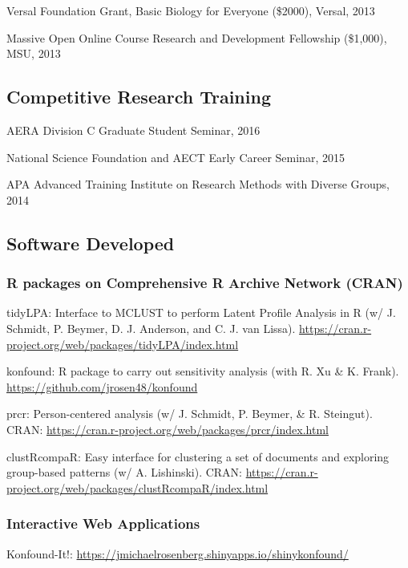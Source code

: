 \documentclass[]{article}
\begin{document}
Versal Foundation Grant, Basic Biology for Everyone (\$2000), Versal,
2013

Massive Open Online Course Research and Development Fellowship
(\$1,000), MSU, 2013

\subsection{Competitive Research
Training}\label{competitive-research-training}

AERA Division C Graduate Student Seminar, 2016

National Science Foundation and AECT Early Career Seminar, 2015

APA Advanced Training Institute on Research Methods with Diverse Groups,
2014

\subsection{Software Developed}\label{software-developed}

\subsubsection{R packages on Comprehensive R Archive Network
(CRAN)}\label{r-packages-on-comprehensive-r-archive-network-cran}

tidyLPA: Interface to MCLUST to perform Latent Profile Analysis in R (w/
J. Schmidt, P. Beymer, D. J. Anderson, and C. J. van Lissa).
\url{https://cran.r-project.org/web/packages/tidyLPA/index.html}

konfound: R package to carry out sensitivity analysis (with R. Xu \& K.
Frank). \url{https://github.com/jrosen48/konfound}

prcr: Person-centered analysis (w/ J. Schmidt, P. Beymer, \& R.
Steingut). CRAN:
\url{https://cran.r-project.org/web/packages/prcr/index.html}

clustRcompaR: Easy interface for clustering a set of documents and
exploring group-based patterns (w/ A. Lishinski). CRAN:
\url{https://cran.r-project.org/web/packages/clustRcompaR/index.html}

\subsubsection{Interactive Web
Applications}\label{interactive-web-applications}

Konfound-It!:
\url{https://jmichaelrosenberg.shinyapps.io/shinykonfound/}
\end{document}
